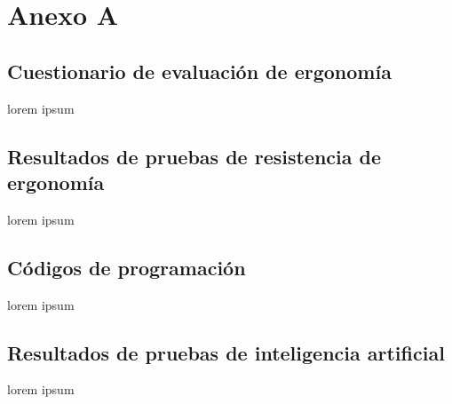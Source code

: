 


\chapter{Anexo A}
\section{Cuestionario de evaluación de ergonomía}
lorem ipsum

\section{Resultados de pruebas de resistencia de ergonomía}
lorem ipsum

\section{Códigos de programación}
lorem ipsum

\section{Resultados de pruebas de inteligencia artificial}
lorem ipsum
